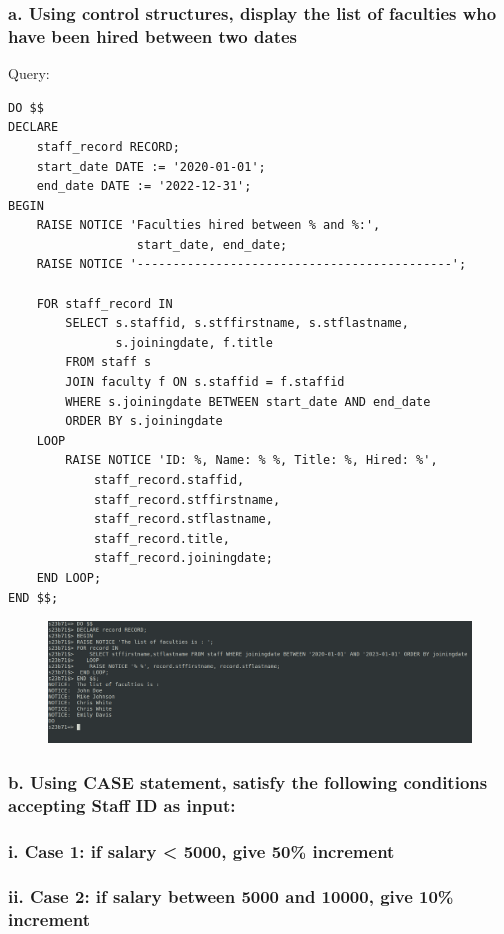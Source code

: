 \documentclass{article}
\begin{document}
\subsubsection*{a. Using control structures, display the list of faculties who have been hired between two dates}
Query:
\begin{Verbatim}[frame=single,framerule=1pt,fontfamily=courier,fontsize=\small]
DO $$
DECLARE
    staff_record RECORD;
    start_date DATE := '2020-01-01';
    end_date DATE := '2022-12-31';
BEGIN
    RAISE NOTICE 'Faculties hired between % and %:', 
                  start_date, end_date;
    RAISE NOTICE '--------------------------------------------';
    
    FOR staff_record IN 
        SELECT s.staffid, s.stffirstname, s.stflastname, 
               s.joiningdate, f.title
        FROM staff s
        JOIN faculty f ON s.staffid = f.staffid
        WHERE s.joiningdate BETWEEN start_date AND end_date
        ORDER BY s.joiningdate
    LOOP
        RAISE NOTICE 'ID: %, Name: % %, Title: %, Hired: %',
            staff_record.staffid,
            staff_record.stffirstname,
            staff_record.stflastname,
            staff_record.title,
            staff_record.joiningdate;
    END LOOP;
END $$;
\end{Verbatim}
\begin{figure}[H]
    \centering
    \includegraphics[width=\textwidth]{cycle5/5_3_a.png}
\end{figure}

\subsubsection*{b. Using CASE statement, satisfy the following conditions accepting Staff ID as input:}
\subsubsection*{i. Case 1: if salary < 5000, give 50\% increment}
\subsubsection*{ii. Case 2: if salary between 5000 and 10000, give 10\% increment}
\end{document}
